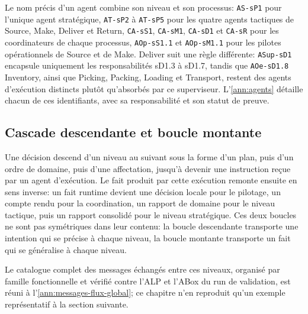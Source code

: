 Le nom précis d'un agent combine son niveau et son processus: \texttt{AS-sP1} pour l'unique agent stratégique, \texttt{AT-sP2} à \texttt{AT-sP5} pour les quatre agents tactiques de Source, Make, Deliver et Return, \texttt{CA-sS1}, \texttt{CA-sM1}, \texttt{CA-sD1} et \texttt{CA-sR} pour les coordinateurs de chaque processus, \texttt{AOp-sS1.1} et \texttt{AOp-sM1.1} pour les pilotes opérationnels de Source et de Make. Deliver suit une règle différente: \texttt{ASup-sD1} encapsule uniquement les responsabilités sD1.3 à sD1.7, tandis que \texttt{AOe-sD1.8} Inventory, ainsi que Picking, Packing, Loading et Transport, restent des agents d'exécution distincts plutôt qu'absorbés par ce superviseur. L'\cref{ann:agents} détaille chacun de ces identifiants, avec sa responsabilité et son statut de preuve.


\subsection{Cascade descendante et boucle montante}

Une décision descend d'un niveau au suivant sous la forme d'un plan, puis d'un ordre de domaine, puis d'une affectation, jusqu'à devenir une instruction reçue par un agent d'exécution. Le fait produit par cette exécution remonte ensuite en sens inverse: un fait runtime devient une décision locale pour le pilotage, un compte rendu pour la coordination, un rapport de domaine pour le niveau tactique, puis un rapport consolidé pour le niveau stratégique. Ces deux boucles ne sont pas symétriques dans leur contenu: la boucle descendante transporte une intention qui se précise à chaque niveau, la boucle montante transporte un fait qui se généralise à chaque niveau.


Le catalogue complet des messages échangés entre ces niveaux, organisé par famille fonctionnelle et vérifié contre l'ALP et l'ABox du run de validation, est réuni à l'\cref{ann:messages-flux-global}; ce chapitre n'en reproduit qu'un exemple représentatif à la section suivante.

